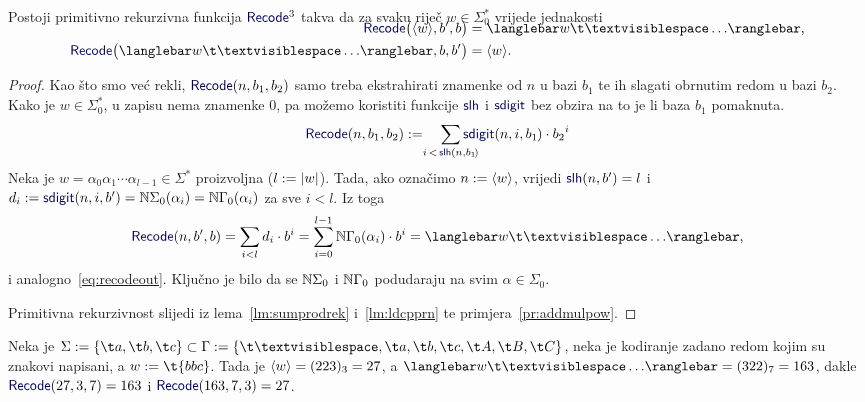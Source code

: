 \begin{lema}[{name=[primitivna rekurzivnost \emph{input\slash output} sustava trake]}]\label{lm:recodeprn}
Postoji primitivno rekurzivna funkcija $\f{Recode}^3$ takva da za svaku riječ $w\in\Sigma_0^*$ vrijede jednakosti
\begin{align}
\SwapAboveDisplaySkip
    \label{eq:recodein}\f{Recode}\bigl(\kr w,b',b\bigr)&=\knk{w\bl\ldots}\text,\\
    \label{eq:recodeout}\f{Recode}\bigl(\knk{w\bl\ldots},b,b'\bigr)&=\kr w\text.
\end{align}
\end{lema}
\begin{proof}
Kao što smo već rekli, $\f{Recode}(n,b_1,b_2)$ samo treba ekstrahirati znamenke od $n$ u bazi $b_1$ te ih slagati obrnutim redom u bazi $b_2$. Kako je $w\in\Sigma_0^*$, u zapisu nema znamenke $0$, pa
možemo koristiti funkcije $\f{slh}$ i $\f{sdigit}$ bez obzira na to je li baza $b_1$ pomaknuta.
\begin{equation}
	\f{Recode}(n,b_1,b_2):=\quad\sum_{\mathclap{i\,<\,\f{slh}(n,b_1\!)}}\f{sdigit}(n,i,b_1\mspace{-1mu})\cdot{b_2}^i
\end{equation}
Neka je $w=\alpha_0\alpha_1\dotsm\alpha_{l-1}\in\Sigma^*$ proizvoljna ($l:=\lvert w\rvert$). Tada, ako označimo $n:=\langle w\rangle$, vrijedi $\f{slh}(n,b')=l$ i $d_i:=\f{sdigit}(n,i,b')=\N\Sigma_0(\alpha_i)=\N\Gamma_0(\alpha_i)$ za sve $i<l$. Iz toga
\begin{equation}
    \f{Recode}(n,b',b)=\sum_{i<l}d_i\cdot b^i=\sum_{i=0}^{l-1}\N\Gamma_0(\alpha_i)\cdot b^i=\knk{w\bl\ldots}\text,
\end{equation}
i analogno~\eqref{eq:recodeout}. Ključno je bilo da se ${\mathbb N}\Sigma_0$ i ${\mathbb N}\Gamma_0$ podudaraju na svim $\alpha\in\Sigma_0$.

    Primitivna rekurzivnost slijedi iz lema~\ref{lm:sumprodrek} i~\ref{lm:ldcpprn} te primjera~\ref{pr:addmulpow}.
\end{proof}

\begin{primjer}[{name=[korištenje \emph{input\slash output} sustava trake]}]
Neka je $\Sigma:=\{\t a,\t b,\t c\}\subset\Gamma:=\{\bl,\t a,\t b,\t c,\t A,\t B,\t C\}$, neka je kodiranje zadano redom kojim su znakovi napisani, a $w:=\t{bbc}$. Tada je $\langle w\rangle=(223)_3=27$, a $\knk{w\bl\ldots}=(322)_7=163$, dakle $\f{Recode}(27,3,7)=163$ i $\f{Recode}(163,7,3)=27$.
\end{primjer}


